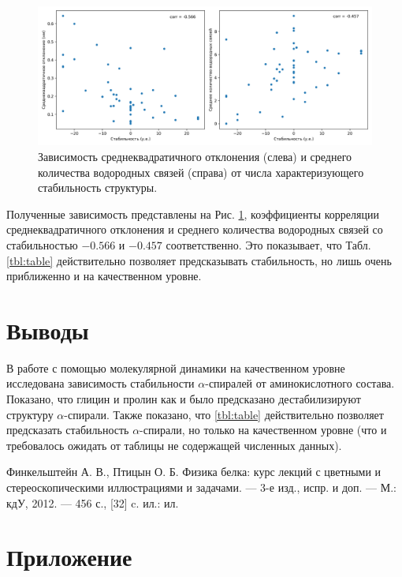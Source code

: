 \documentclass[
11pt,%
tightenlines,%
twoside,%
onecolumn,%
nofloats,%
nobibnotes,%
nofootinbib,%
superscriptaddress,%
noshowpacs,%
centertags]%
{revtex4}
\begin{document}
\begin{figure}[h]
	\centering
	\includegraphics[width=\textwidth]{stability}
	\caption{Зависимость среднеквадратичного отклонения (слева) 
		и среднего количества водородных связей (справа) от числа характеризующего стабильность структуры.}
	\label{pic:stability}
		
\end{figure}

Полученные зависимость представлены на Рис. \ref{pic:stability}, 
коэффициенты корреляции среднеквадратичного отклонения и среднего количества водородных связей 
со стабильностью $-0.566$ и $-0.457$ соответственно. 
Это показывает, что Табл. \ref{tbl:table} действительно позволяет предсказывать стабильность,
но лишь очень приближенно и на качественном уровне.

\section{Выводы}
В работе с помощью молекулярной динамики на качественном уровне исследована 
зависимость стабильности $\alpha$-спиралей от аминокислотного состава.
Показано, что глицин и пролин как и было предсказано дестабилизируют структуру $\alpha$-спирали.
Также показано, что \ref{tbl:table} действительно позволяет предсказать стабильность $\alpha$-спирали,
но только на качественном уровне (что и требовалось ожидать от таблицы не содержащей численных данных).


%
%

\begin{thebibliography}{99}
Финкельштейн А. В., Птицын О. Б. Физика белка: 
курс лекций с цветными и стереоскопическими иллюстрациями и задачами. — 3-е изд., испр. и доп. — М.: кдУ, 2012. —
456 с., [32] c. ил.: ил.


\end{thebibliography}

\newpage
\section{Приложение}
\label{sec:addition}
\end{document}
